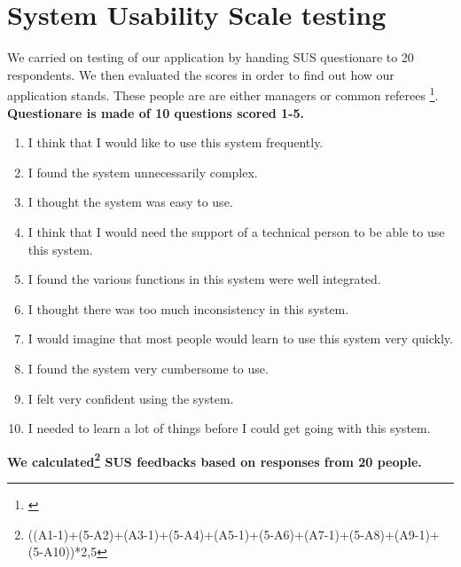 \section{System Usability Scale testing}
We carried on testing of our application by handing SUS questionare to 20 respondents. We then evaluated the scores in order to find out how our application stands. These people are are either managers or common referees \footnote{\cite{SUSDesc}}. 
\newline
\textbf{Questionare is made of 10 questions scored 1-5.}
\begin{enumerate}
    \item I think that I would like to use this system frequently.
    \item I found the system unnecessarily complex.
    \item I thought the system was easy to use.
    \item I think that I would need the support of a technical person to be able to use this system.
    \item I found the various functions in this system were well integrated.
    \item I thought there was too much inconsistency in this system.
    \item I would imagine that most people would learn to use this system very quickly.
    \item I found the system very cumbersome to use.
    \item I felt very confident using the system.
    \item I needed to learn a lot of things before I could get going with this system.
\end{enumerate}
\textbf{We calculated\footnote{((A1-1)+(5-A2)+(A3-1)+(5-A4)+(A5-1)+(5-A6)+(A7-1)+(5-A8)+(A9-1)+(5-A10))*2,5} SUS feedbacks based on responses from 20 people.}
\newline
